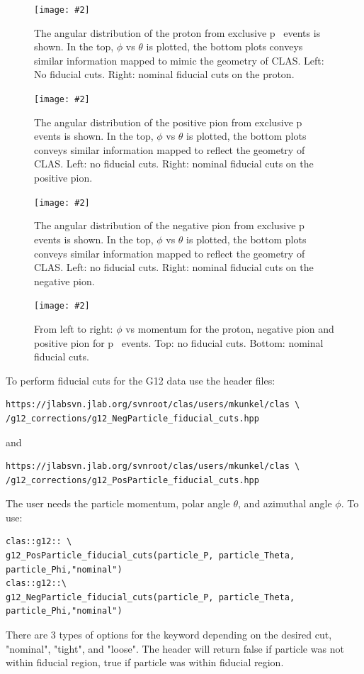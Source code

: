 \newcommand{\onefig}[3]{
\begin{figure}
    \centering
    \texttt{[image: \#2]}
    \caption{#3}
    \label{#2}
    \end{figure}
}


\onefig{0.6}{figures/fiducial/fid2}{The angular distribution of the proton from exclusive \mbox{p \π[+] \π[-]} events is shown.  In the top, $\phi$ vs $\theta$ is plotted, the bottom plots conveys similar information mapped to mimic the geometry of CLAS. Left: No fiducial cuts. Right: nominal fiducial cuts on the proton.}
\onefig{0.6}{figures/fiducial/fid3}{The angular distribution of the positive pion from exclusive \mbox{p \π[+] \π[-]} events is shown.  In the top, $\phi$ vs $\theta$ is plotted, the bottom plots conveys similar information mapped to reflect the geometry of CLAS. Left: no fiducial cuts. Right: nominal fiducial cuts on the positive pion.}
\onefig{0.6}{figures/fiducial/fid4}{The angular distribution of the negative pion from exclusive \mbox{p \π[+] \π[-]} events is shown.  In the top, $\phi$ vs $\theta$ is plotted, the bottom plots conveys similar information mapped to reflect the geometry of CLAS. Left: no fiducial cuts. Right: nominal fiducial cuts on the negative pion.}
\onefig{0.7}{figures/fiducial/fid5}{From left to right: $\phi$ vs momentum for the proton, negative pion and positive pion for \mbox{p \π[+] \π[-]} events. Top: no fiducial cuts. Bottom: nominal fiducial cuts.}
\newpage
To perform fiducial cuts for the G12 data use the header files:
\begin{verbatim}
https://jlabsvn.jlab.org/svnroot/clas/users/mkunkel/clas \
/g12_corrections/g12_NegParticle_fiducial_cuts.hpp
\end{verbatim}
and
\begin{verbatim}
https://jlabsvn.jlab.org/svnroot/clas/users/mkunkel/clas \
/g12_corrections/g12_PosParticle_fiducial_cuts.hpp
\end{verbatim}
The user needs the particle momentum, polar angle $\theta$, and azimuthal angle $\phi$. To use:
\begin{verbatim}
clas::g12:: \
g12_PosParticle_fiducial_cuts(particle_P, particle_Theta, particle_Phi,"nominal")
clas::g12::\
g12_NegParticle_fiducial_cuts(particle_P, particle_Theta, particle_Phi,"nominal")
\end{verbatim}
There are 3 types of options for the keyword depending on the desired cut, "nominal", "tight", and "loose". The header will return false if particle was not within fiducial region, true if particle was within fiducial region.
